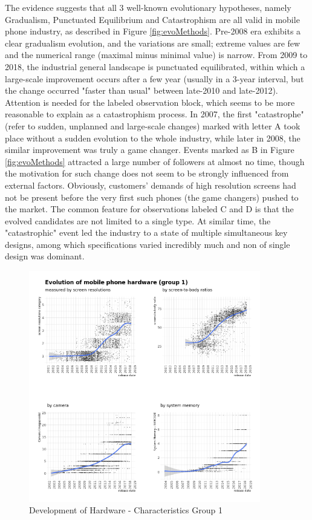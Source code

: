 \documentclass[utf8,english]{gradu3}
\begin{document}
The evidence suggests that all 3 well-known evolutionary hypotheses, namely Gradualism, Punctuated Equilibrium and Catastrophism are all valid in mobile phone industry, as described in Figure \ref{fig:evoMethods}. Pre-2008 era exhibits a clear gradualism evolution, and the variations are small; extreme values are few and the numerical range (maximal minus minimal value) is narrow. From 2009 to 2018, the industrial general landscape is punctuated equilibrated, within which a large-scale improvement occurs after a few year (usually in a 3-year interval, but the change occurred "faster than usual" between late-2010 and late-2012). Attention is needed for the labeled observation block, which seems to be more reasonable to explain as a catastrophism process. In 2007, the first "catastrophe" (refer to sudden, unplanned and large-scale changes) marked with letter A took place without a sudden evolution to the whole industry, while later in 2008, the similar improvement was truly a game changer. Events marked as B in Figure \ref{fig:evoMethods} attracted a large number of followers at almost no time, though the motivation for such change does not seem to be strongly influenced from external factors. Obviously, customers' demands of high resolution screens had not be present before the very first such phones (the game changers) pushed to the market. The common feature for observations labeled C and D is that the evolved candidates are not limited to a single type. At similar time, the "catastrophic" event led the industry to a state of multiple simultaneous key designs, among which specifications varied incredibly much and non of single design was dominant. 

\begin{figure}[htb]
    \centering
    \includegraphics[width=0.90\textwidth]{evo1.png}
    \caption{Development of Hardware - Characteristics Group 1}
    \label{fig:screen resolutions}
\end{figure}
\end{document}
